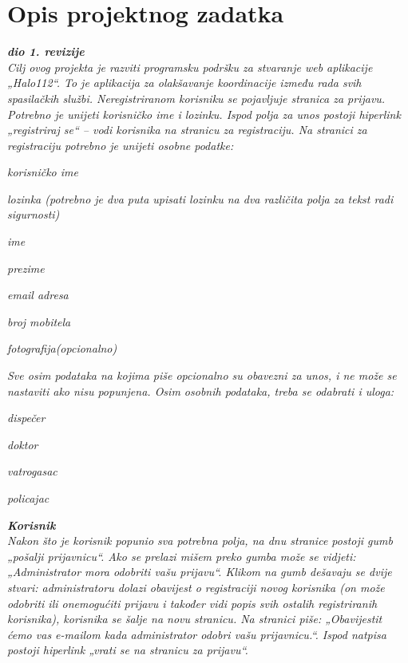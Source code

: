 \chapter{Opis projektnog zadatka}
		
		\textbf{\textit{dio 1. revizije}}\\
		
		\textit{Cilj ovog projekta je razviti programsku podršku za stvaranje web aplikacije „Halo112“. To je aplikacija za olakšavanje koordinacije između rada svih spasilačkih službi. Neregistriranom korisniku se pojavljuje stranica za prijavu. Potrebno je unijeti korisničko ime i lozinku. Ispod polja za unos postoji hiperlink „registriraj se“ – vodi korisnika na stranicu za registraciju.
			Na stranici za registraciju potrebno je unijeti osobne podatke:
		}
		\begin{packed_item}
			\item \textit{korisničko ime}
			\item \textit{lozinka (potrebno je dva puta upisati lozinku na dva različita polja za tekst radi sigurnosti)}
			\item \textit{ime}
			\item \textit{prezime }
			\item \textit{email adresa}
			\item \textit{broj mobitela}
			\item \textit{fotografija(opcionalno)}
		\end{packed_item}
		\textit{Sve osim podataka na kojima piše opcionalno su obavezni za unos, i ne može se nastaviti ako nisu popunjena. Osim osobnih podataka, treba se odabrati i uloga:
		}
		\begin{packed_item}
			\item \textit{dispečer}
			\item \textit{doktor}
			\item \textit{vatrogasac}
			\item \textit{policajac }
		\end{packed_item}
		
		\textbf{\textit{Korisnik}}\\
		\textit{Nakon što je korisnik popunio sva potrebna polja, na dnu stranice postoji gumb „pošalji prijavnicu“. Ako se prelazi mišem preko gumba može se vidjeti: „Administrator mora odobriti vašu prijavu“. Klikom na gumb dešavaju se dvije stvari: administratoru dolazi obavijest o registraciji novog korisnika (on može odobriti ili onemogućiti prijavu i također vidi popis svih ostalih registriranih korisnika), korisnika se šalje na novu stranicu. Na stranici piše: „Obavijestit ćemo vas e-mailom kada administrator odobri vašu prijavnicu.“. Ispod natpisa postoji hiperlink „vrati se na stranicu za prijavu“.}
		
